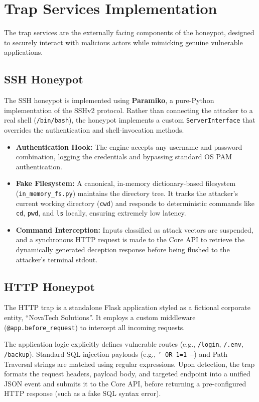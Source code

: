 \section{Trap Services Implementation}

The trap services are the externally facing components of the honeypot, designed to securely interact with malicious actors while mimicking genuine vulnerable applications.

\subsection{SSH Honeypot}
The \ac{SSH} honeypot is implemented using \textbf{Paramiko}, a pure-Python implementation of the \ac{SSH}v2 protocol. Rather than connecting the attacker to a real shell (\texttt{/bin/bash}), the honeypot implements a custom \texttt{ServerInterface} that overrides the authentication and shell-invocation methods.

\begin{itemize}
    \item \textbf{Authentication Hook:} The engine accepts any username and password combination, logging the credentials and bypassing standard OS PAM authentication.
    \item \textbf{Fake Filesystem:} A canonical, in-memory dictionary-based filesystem (\texttt{in\_memory\_fs.py}) maintains the directory tree. It tracks the attacker's current working directory (\texttt{cwd}) and responds to deterministic commands like \texttt{cd}, \texttt{pwd}, and \texttt{ls} locally, ensuring extremely low latency.
    \item \textbf{Command Interception:} Inputs classified as attack vectors are suspended, and a synchronous \ac{HTTP} request is made to the Core API to retrieve the dynamically generated deception response before being flushed to the attacker's terminal stdout.
\end{itemize}

\subsection{HTTP Honeypot}
The HTTP trap is a standalone Flask application styled as a fictional corporate entity, ``NovaTech Solutions''. It employs a custom middleware (\texttt{@app.before\_request}) to intercept all incoming requests. 

The application logic explicitly defines vulnerable routes (e.g., \texttt{/login}, \texttt{/.env}, \texttt{/backup}). Standard SQL injection payloads (e.g., \texttt{' OR 1=1 --}) and Path Traversal strings are matched using regular expressions. Upon detection, the trap formats the request headers, payload body, and targeted endpoint into a unified JSON event and submits it to the Core API, before returning a pre-configured HTTP response (such as a fake SQL syntax error).

